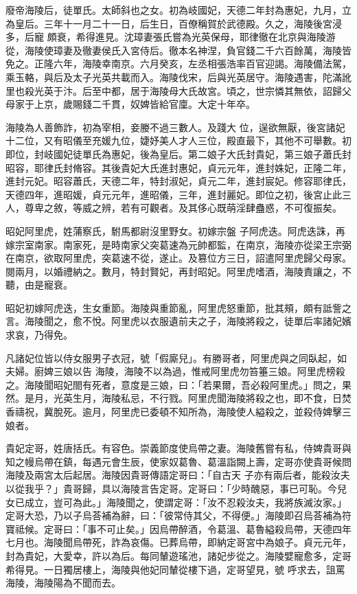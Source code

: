 \begin{pinyinscope}
 廢帝海陵后，徒單氏。太師斜也之女。初為岐國妃，天德二年封為惠妃，九月，立為皇后。三年十一月二十一日，后生日，百僚稱賀於武德殿。久之，海陵後宮浸多，后寵
 頗衰，希得進見。沈璋妻張氏嘗為光英保母，耶律徹在北京與海陵游從，海陵使璋妻及徹妻侯氏入宮侍后。徹本名神涅，負官錢二千六百餘萬，海陵皆免之。正隆六年，海陵幸南京。六月癸亥，左丞相張浩率百官迎謁。海陵備法駕，乘玉輅，與后及太子光英共載而入。海陵伐宋，后與光英居守。海陵遇害，陀滿訛里也殺光英于汴。后至中都，居于海陵母大氏故宮。頃之，世宗憐其無依，詔歸父母家于上京，歲賜錢二千貫，奴婢皆給官廩。大定十年卒。



 海陵為人善飾詐，初為宰相，妾媵不過三數人。及踐大
 位，逞欲無厭，後宮諸妃十二位，又有昭儀至充媛九位，婕妤美人才人三位，殿直最下，其他不可舉數。初即位，封岐國妃徒單氏為惠妃，後為皇后。第二娘子大氏封貴妃，第三娘子蕭氏封昭容，耶律氏封脩容。其後貴妃大氏進封惠妃，貞元元年，進封姝妃，正隆二年，進封元妃。昭容蕭氏，天德二年，特封淑妃，貞元二年，進封宸妃。修容耶律氏，天德四年，進昭媛，貞元元年，進昭儀，三年，進封麗妃。即位之初，後宮止此三人，尊卑之敘，等威之辨，若有可觀者。及其侈心既萌淫肆蠱惑，不可復振矣。



 昭妃阿里虎，姓蒲察氏，駙馬都尉沒里野女。初嫁宗盤
 子阿虎迭。阿虎迭誅，再嫁宗室南家。南家死，是時南家父突葛速為元帥都監，在南京，海陵亦從梁王宗弼在南京，欲取阿里虎，突葛速不從，遂止。及篡位方三日，詔遣阿里虎歸父母家。閱兩月，以婚禮納之。數月，特封賢妃，再封昭妃。阿里虎嗜酒，海陵責讓之，不聽，由是寵衰。



 昭妃初嫁阿虎迭，生女重節。海陵與重節亂，阿里虎怒重節，批其頰，頗有詆訾之言。海陵聞之，愈不悅。阿里虎以衣服遺前夫之子，海陵將殺之，徒單后率諸妃嬪求哀，乃得免。



 凡諸妃位皆以侍女服男子衣冠，號「假廝兒」。有勝哥者，阿里虎與之同臥起，如夫婦。廚婢三娘以告
 海陵，海陵不以為過，惟戒阿里虎勿笞箠三娘。阿里虎榜殺之。海陵聞昭妃閤有死者，意度是三娘，曰：「若果爾，吾必殺阿里虎。」問之，果然。是月，光英生月，海陵私忌，不行戮。阿里虎聞海陵將殺之也，即不食，日焚香禱祝，冀脫死。逾月，阿里虎已委頓不知所為，海陵使人縊殺之，並殺侍婢擊三娘者。



 貴妃定哥，姓唐括氏。有容色。崇義節度使烏帶之妻。海陵舊嘗有私，侍婢貴哥與知之幔烏帶在鎮，每遇元會生辰，使家奴葛魯、葛溫詣闕上壽，定哥亦使貴哥候問海陵及兩宮太后起居。海陵因貴哥傳語定哥曰：「自古天
 子亦有兩后者，能殺汝夫以從我乎？」貴哥歸，具以海陵言告定哥。定哥曰：「少時醜惡，事已可恥。今兒女已成立，豈可為此。」海陵聞之，使謂定哥：「汝不忍殺汝夫，我將族滅汝家。」定哥大恐，乃以子烏荅補為辭，曰：「彼常侍其父，不得便。」海陵即召烏荅補為符寶祗候。定哥曰：「事不可止矣。」因烏帶醉酒，令葛溫、葛魯縊殺烏帶，天德四年七月也。海陵聞烏帶死，詐為哀傷。已葬烏帶，即納定哥宮中為娘子。貞元元年，封為貴妃，大愛幸，許以為后。每同輦遊瑤池，諸妃步從之。海陵嬖寵愈多，定哥希得見。一日獨居樓上，海陵與他妃同輦從樓下過，定哥望見，號
 呼求去，詛罵海陵，海陵陽為不聞而去。




\end{pinyinscope}
